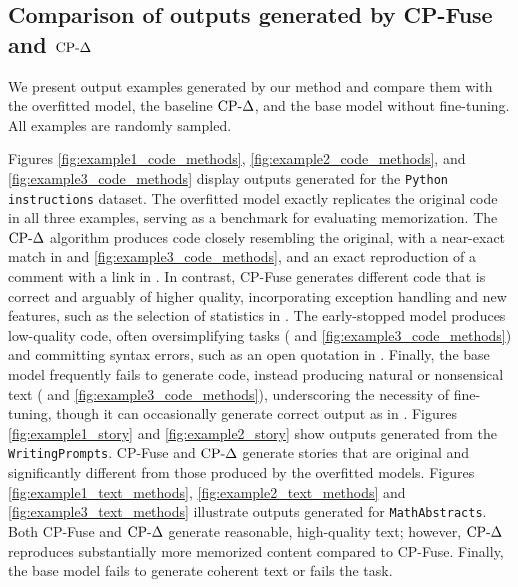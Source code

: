 \newpage



\subsection{Comparison of outputs generated by CP-Fuse and \texorpdfstring{$\text{CP-}\Delta$}{CPDelta} }
\label{app:comparison_cpdelta}

We present output examples generated by our method and compare them with the overfitted model, the baseline $\text{CP-}\Delta$, and the base model without fine-tuning. All examples are randomly sampled.

Figures \ref{fig:example1_code_methods}, \ref{fig:example2_code_methods}, and \ref{fig:example3_code_methods} display outputs generated for the \texttt{Python instructions} dataset. The overfitted model exactly replicates the original code in all three examples, serving as a benchmark for evaluating memorization. The $\text{CP-}\Delta$ algorithm produces code closely resembling the original, with a near-exact match in  and \ref{fig:example3_code_methods}, and an exact reproduction of a comment with a link in . In contrast, CP-Fuse generates different code that is correct and arguably of higher quality, incorporating exception handling and new features, such as the selection of statistics in . 
The early-stopped model produces low-quality code, often oversimplifying tasks ( and \ref{fig:example3_code_methods}) and committing syntax errors, such as an open quotation in . 
 Finally, the base model frequently fails to generate code, instead producing natural or nonsensical text ( and \ref{fig:example3_code_methods}), underscoring the necessity of fine-tuning, though it can occasionally generate correct output as in   . Figures \ref{fig:example1_story} and \ref{fig:example2_story} show outputs generated from the \texttt{WritingPrompts}. CP-Fuse and $\text{CP-}\Delta$ generate stories that are original and significantly different from those produced by the overfitted models. Figures \ref{fig:example1_text_methods}, \ref{fig:example2_text_methods} and \ref{fig:example3_text_methods} illustrate outputs generated for \texttt{MathAbstracts}. Both CP-Fuse and $\text{CP-}\Delta$ generate reasonable, high-quality text; however, $\text{CP-}\Delta$ reproduces substantially more memorized content compared to CP-Fuse. Finally, the base model fails to generate coherent text  or fails the task.

